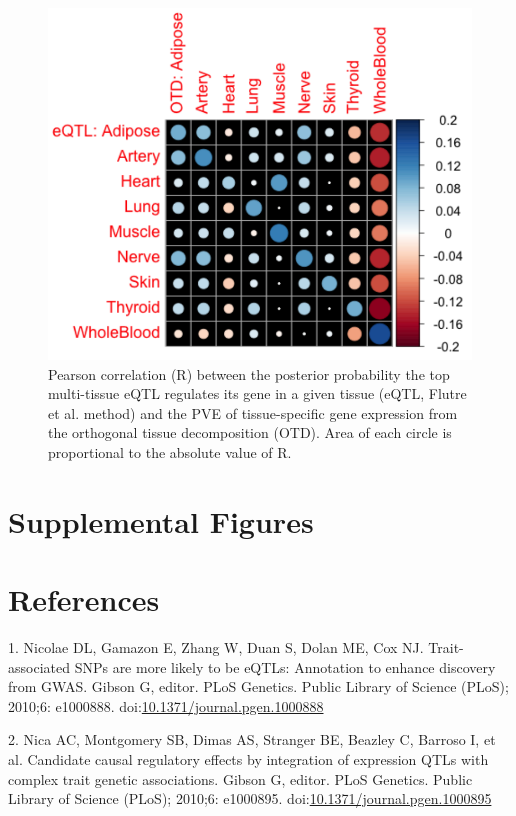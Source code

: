 \documentclass[]{article}
\begin{document}
\begin{figure}[htbp]
\centering
\includegraphics{GenArch_manuscript_files/figure-latex/corrplot-1.pdf}
\caption{Pearson correlation (R) between the posterior probability the
top multi-tissue eQTL regulates its gene in a given tissue (eQTL, Flutre
et al. method) and the PVE of tissue-specific gene expression from the
orthogonal tissue decomposition (OTD). Area of each circle is
proportional to the absolute value of R.}
\end{figure}

\section{Supplemental Figures}\label{supplemental-figures}

\section*{References}\label{references}

1. Nicolae DL, Gamazon E, Zhang W, Duan S, Dolan ME, Cox NJ.
Trait-associated SNPs are more likely to be eQTLs: Annotation to enhance
discovery from GWAS. Gibson G, editor. PLoS Genetics. Public Library of
Science (PLoS); 2010;6: e1000888.
doi:\href{http://dx.doi.org/10.1371/journal.pgen.1000888}{10.1371/journal.pgen.1000888}

2. Nica AC, Montgomery SB, Dimas AS, Stranger BE, Beazley C, Barroso I,
et al. Candidate causal regulatory effects by integration of expression
QTLs with complex trait genetic associations. Gibson G, editor. PLoS
Genetics. Public Library of Science (PLoS); 2010;6: e1000895.
doi:\href{http://dx.doi.org/10.1371/journal.pgen.1000895}{10.1371/journal.pgen.1000895}
\end{document}
